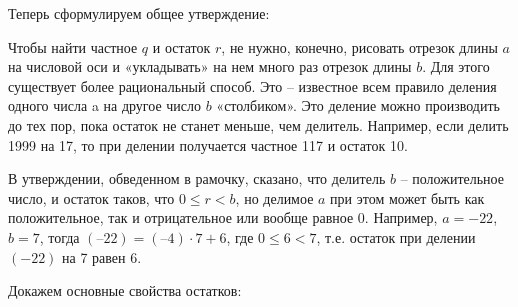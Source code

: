 Теперь сформулируем общее утверждение:


Чтобы найти частное $q$ и остаток $r$, не нужно, конечно, рисовать отрезок длины $a$ на числовой оси и «укладывать» на нем много раз отрезок длины $b$. Для этого существует более рациональный способ. Это – известное всем правило деления одного числа a на другое число $b$ «столбиком». Это деление можно производить до тех пор, пока остаток не станет меньше, чем делитель. Например, если делить 1999 на 17, то при делении получается частное 117 и остаток 10.

\begin{prim}
В утверждении, обведенном в рамочку, сказано, что делитель $b$ – положительное число, и остаток таков, что $0  \leqslant r < b$, но делимое $a$ при этом может быть как положительное, так и отрицательное или вообще равное $0$. Например, $a = -22$, $b = 7$, тогда   $(–22) = (–4)\cdot 7 + 6$, где $0 \leqslant 6 <7$, т.е. остаток при делении $(-22)$ на 7 равен 6.
\end{prim}



Докажем основные свойства остатков:



